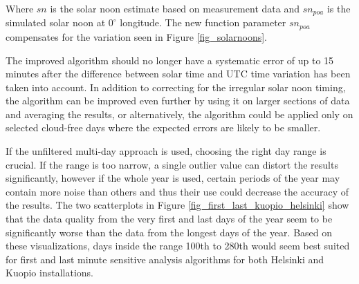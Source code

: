 \noindent Where $sn$ is the solar noon estimate based on measurement data and $sn_{poa}$ is the simulated solar noon at $0^\circ$ longitude. The new function parameter $sn_{poa}$ compensates for the variation seen in Figure \ref{fig_solarnoons}.



\vspace{5mm}


\noindent



\vspace{0.5cm}
\noindent The improved algorithm should no longer have a systematic error of up to 15 minutes after the difference between solar time and UTC time variation has been taken into account. In addition to correcting for the irregular solar noon timing, the algorithm can be improved even further by using it on larger sections of data and averaging the results, or alternatively, the algorithm could be applied only on selected cloud-free days where the expected errors are likely to be smaller.

If the unfiltered multi-day approach is used, choosing the right day range is crucial. If the range is too narrow, a single outlier value can distort the results significantly, however if the whole year is used, certain periods of the year may contain more noise than others and thus their use could decrease the accuracy of the results. The two scatterplots in Figure \ref{fig_first_last_kuopio_helsinki} show that the data quality from the very first and last days of the year seem to be significantly worse than the data from the longest days of the year. Based on these visualizations, days inside the range 100th to 280th would seem best suited for first and last minute sensitive analysis algorithms for both Helsinki and Kuopio installations.



